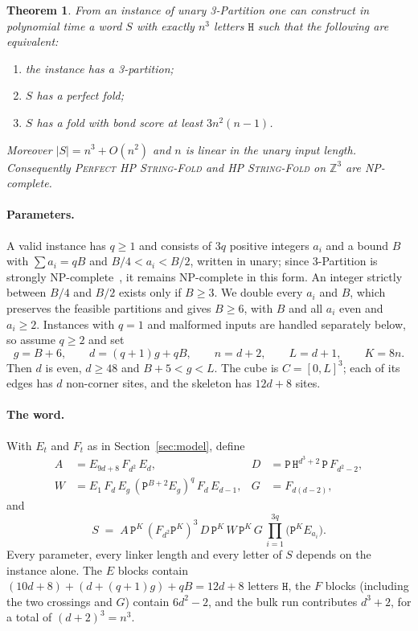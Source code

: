 \documentclass[11pt,letterpaper]{article}
\newtheorem{theorem}{Theorem}
\theoremstyle{definition}
\theoremstyle{remark}
\newcommand{\Hh}{\mathtt{H}}
\newcommand{\Pp}{\mathtt{P}}
\newcommand{\Z}{\mathbb{Z}}
\newcommand{\prob}[1]{\textup{\textsc{#1}}}
\begin{document}
\begin{theorem}\label{thm:edge}
From an instance of unary 3-Partition one can construct in polynomial time a word $S$ with exactly
$n^3$ letters $\Hh$ such that the following are equivalent:
\begin{enumerate}[label=(\roman*)]
  \item the instance has a 3-partition;
  \item $S$ has a perfect fold;
  \item $S$ has a fold with bond score at least $3n^2(n-1)$.
\end{enumerate}
Moreover $|S|=n^3+O(n^2)$ and $n$ is linear in the unary input length. Consequently
\prob{Perfect HP String-Fold} and \prob{HP String-Fold} on $\Z^3$ are NP-complete.
\end{theorem}

\paragraph{Parameters.}
A valid instance has $q\ge1$ and consists of $3q$ positive integers $a_i$ and a bound $B$ with $\sum a_i=qB$ and
$B/4<a_i<B/2$, written in unary; since 3-Partition is strongly NP-complete~\cite{GJ79}, it remains
NP-complete in this form. An integer strictly between $B/4$ and $B/2$ exists only if $B\ge3$. We
double every $a_i$ and $B$, which preserves the feasible partitions and gives $B\ge6$, with $B$ and all
$a_i$ even and $a_i\ge2$. Instances with $q=1$ and malformed inputs are handled separately below, so
assume $q\ge2$ and set
\begin{equation}\label{eq:params}
  g=B+6,\qquad d=(q+1)g+qB,\qquad n=d+2,\qquad L=d+1,\qquad K=8n.
\end{equation}
Then $d$ is even, $d\ge 48$ and $B+5<g<L$. The cube is $C=[0,L]^3$; each of its edges has $d$
non-corner sites, and the skeleton has $12d+8$ sites.

\paragraph{The word.}
With $E_t$ and $F_t$ as in Section~\ref{sec:model}, define
\[
\begin{aligned}
  A&=E_{9d+8}\,F_{d^2}\,E_d, & D&=\Pp\,\Hh^{d^3+2}\,\Pp\,F_{d^2-2},\\
  W&=E_1\,F_d\,E_g\,(\Pp^{B+2}E_g)^q\,F_d\,E_{d-1}, & G&=F_{d(d-2)},
\end{aligned}
\]
and
\begin{equation}\label{eq:word}
  S \;=\; A\,\Pp^K\,(F_{d^2}\Pp^K)^3\,D\,\Pp^K\,W\,\Pp^K\,G\,\prod_{i=1}^{3q}\bigl(\Pp^K E_{a_i}\bigr).
\end{equation}
Every parameter, every linker length and every letter of $S$ depends on the instance alone. The $E$
blocks contain $(10d+8)+(d+(q+1)g)+qB=12d+8$ letters $\Hh$, the $F$ blocks (including the two
crossings and $G$) contain $6d^2-2$, and the bulk run contributes $d^3+2$, for a total of
$(d+2)^3=n^3$.
\end{document}
